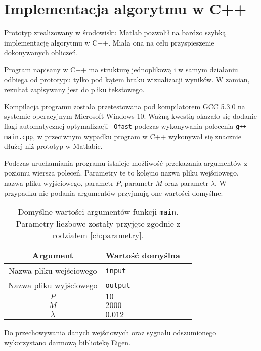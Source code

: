 \section{Implementacja algorytmu w C++}

Prototyp zrealizowany w środowisku Matlab pozwolił na bardzo szybką implementację algorytmu w C++. Miała ona na celu przyspieszenie dokonywanych obliczeń.

Program napisany w C++ ma strukturę jednoplikową i w samym działaniu odbiega od prototypu tylko pod kątem braku wizualizacji wyników. W zamian, rezultat zapisywany jest do pliku tekstowego.

Kompilacja programu została przetestowana pod kompilatorem GCC 5.3.0 na systemie operacyjnym Microsoft Windows 10. Ważną kwestią okazało się dodanie flagi automatycznej optymalizacji \texttt{-Ofast} podczas wykonywania polecenia \texttt{g++ main.cpp}, w przeciwnym wypadku program w C++ wykonywał się znacznie dłużej niż prototyp w Matlabie. 

Podczas uruchamiania programu istnieje możliwość przekazania argumentów z poziomu wiersza poleceń. Parametry te to kolejno nazwa pliku wejściowego, nazwa pliku wyjściowego, parametr $ P $, parametr $ M $ oraz parametr $ \lambda $. W przypadku nie podania argumentów przyjmują one wartości domyślne:

\begin{table}[!htb]
	\centering
	\caption{Domyślne wartości argumentów funkcji \texttt{main}. Parametry liczbowe zostały przyjęte zgodnie z rodziałem \ref{ch:parametry}. }
	\begin{tabular}{|c|l|l|}
		\hline
		Argument & Wartość domyślna \\
		\hline
		Nazwa pliku wejściowego & \texttt{input} \\
		\hline
		Nazwa pliku wyjściowego & \texttt{output} \\
		\hline
		$P$ & $10$ \\
		\hline
		$M$ & $2000$ \\
		\hline
		$\lambda$ & $0.012$ \\
		\hline
	\end{tabular}
	\label{tab:tabela1}
\end{table}

Do przechowywania danych wejściowych oraz sygnału odszumionego wykorzystano darmową bibliotekę Eigen.